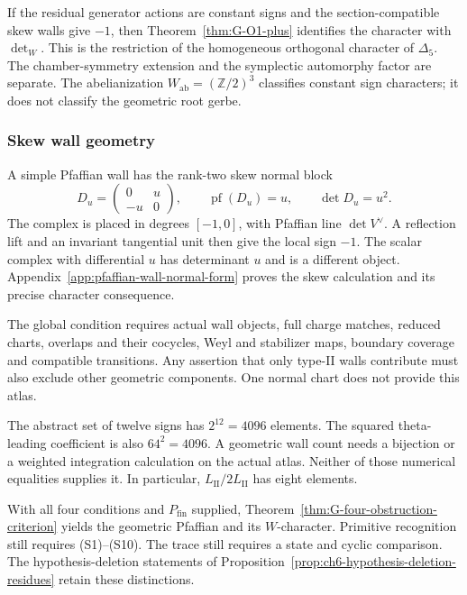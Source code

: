 If the residual generator actions are constant signs and the
section-compatible skew walls give \(-1\), then
Theorem~\ref{thm:G-O1-plus} identifies the character with
\(\det_W\). This is the restriction of the homogeneous
orthogonal character of \(\Delta_5\). The chamber-symmetry
extension and the symplectic automorphy factor are separate.
The abelianization \(W_{\mathrm{ab}}=(\mathbb Z/2)^3\)
classifies constant sign characters; it does not classify the
geometric root gerbe.

\subsubsection{Skew wall geometry}
\label{subsubsec:obstruction-O2}

A simple Pfaffian wall has the rank-two skew normal block
\[
 D_u=\begin{pmatrix}0&u\\-u&0\end{pmatrix},
 \qquad \operatorname{pf}(D_u)=u,
 \qquad \det D_u=u^2.
\]
The complex is placed in degrees \([-1,0]\), with Pfaffian line
\(\det V^\vee\). A reflection lift and an invariant tangential
unit then give the local sign \(-1\). The scalar complex with
differential \(u\) has determinant \(u\) and is a different
object. Appendix~\ref{app:pfaffian-wall-normal-form} proves the
skew calculation and its precise character consequence.

The global condition requires actual wall objects, full charge
matches, reduced charts, overlaps and their cocycles, Weyl and
stabilizer maps, boundary coverage and compatible transitions.
Any assertion that only type-II walls contribute must also exclude
other geometric components. One normal chart does not provide
this atlas.

The abstract set of twelve signs has \(2^{12}=4096\) elements.
The squared theta-leading coefficient is also \(64^2=4096\).
A geometric wall count needs a bijection or a weighted integration
calculation on the actual atlas. Neither of those numerical
equalities supplies it. In particular,
\(L_{\mathrm{II}}/2L_{\mathrm{II}}\) has eight elements.

With all four conditions and \(P_{\mathrm{fin}}\) supplied,
Theorem~\ref{thm:G-four-obstruction-criterion} yields the geometric
Pfaffian and its \(W\)-character. Primitive recognition still
requires \textup{(S1)}--\textup{(S10)}. The trace still requires a
state and cyclic comparison. The hypothesis-deletion statements
of Proposition~\ref{prop:ch6-hypothesis-deletion-residues} retain
these distinctions.


